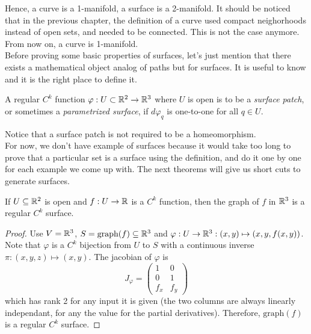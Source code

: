 Hence, a curve is a 1-manifold, a surface is a 2-manifold. It should be noticed that in the previous chapter, the definition of a curve used compact neighorhoods instead of open sets, and needed to be connected. This is not the case anymore. From now on, a curve is 1-manifold. \\

Before proving some basic properties of surfaces, let's just mention that there exists a mathematical object analog of paths but for surfaces. It is useful to know and it is the right place to define it.

\begin{definition}
    A regular $C^k$ function $\varphi : U \subset \mathbb{R}^2 \to \mathbb{R}^3$ where $U$ is open is to be a \textit{surface patch}, or sometimes a \textit{parametrized surface}, if $d\varphi_q$ is one-to-one for all $q \in U$.
\end{definition}

Notice that a surface patch is not required to be a homeomorphism. \\

For now, we don't have example of surfaces because it would take too long to prove that a particular set is a surface using the definition, and do it one by one for each example we come up with. The next theorems will give us short cuts to generate surfaces.

\begin{proposition}
    If $U \subseteq \mathbb{R}^2$ is open and $f : U \to \mathbb{R}$ is a $C^k$ function, then the graph of $f$ in $\mathbb{R}^3$ is a regular $C^k$ surface.
\end{proposition}

\begin{proof}
    Use $V = \mathbb{R}^3$, $S = \text{graph}(f) \subseteq \mathbb{R}^3$ and $\varphi : U \to \mathbb{R}^3 : (x,y) \mapsto (x,y,f(x,y))$. Note that $\varphi$ is a $C^k$ bijection from $U$ to $S$ with a continuous inverse $\pi: (x,y,z) \mapsto (x,y)$. The jacobian of $\varphi$ is
    $$J_{\varphi} = \begin{pmatrix}
        1 & 0 \\
        0 & 1 \\
        f_x & f_y
    \end{pmatrix}$$
    which has rank 2 for any input it is given (the two columns are always linearly independant, for any the value for the partial derivatives). Therefore, $\text{graph}(f)$ is a regular $C^k$ surface.
\end{proof}

